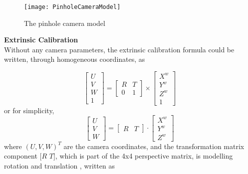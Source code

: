 \begin{figure}[h]
\centering
\texttt{[image: PinholeCameraModel]}
\caption{The pinhole camera model}
\label{PinholeCameraModel}
\end{figure}%
%
\textbf{Extrinsic Calibration}\\
Without any camera parameters, the extrinsic calibration formula could be written, through homogeneous coordinates, as

\begin{equation}
%
\left[ \begin{array}{c} U \\ V \\ W \\ 1 \end{array} \right] %
= %
\begin{bmatrix} R & T \\ 0 & 1 \end{bmatrix} \times \left[ \begin{array}{c} X^w \\ Y^w \\ Z^w \\ 1 \end{array} \right]
%
\end{equation}%
%
or for simplicity,
\begin{equation}
%
\left[ \begin{array}{c} U \\ V \\ W \end{array} \right] %
= %
\begin{bmatrix} R & T \end{bmatrix} \cdot \left[ \begin{array}{c} X^w \\ Y^w \\ Z^w \end{array} \right]
\label{extrinsicTransform}
%
\end{equation}%
%
where \((U, V, W)^T\) are the camera coordinates, and the transformation matrix component \([R\)  \(T]\), which is part of the 4x4 perspective matrix, is modelling rotation and translation , written as

